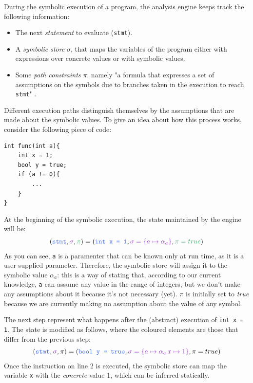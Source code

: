 \documentclass[12pt,a4paper]{book}
\theoremstyle{definition}
\begin{document}
	During the symbolic execution of a program, the analysis engine keeps track the following information:
	\begin{itemize}
		\item The next \textit{statement} to evaluate (\texttt{stmt}).
		\item A \textit{symbolic store} $\sigma$, that maps the variables of the program either with expressions over concrete values or with symbolic values.
		\item Some \textit{path constraints} $\pi$, namely "a formula that expresses a set of assumptions on the symbols due to branches taken in the execution to reach \texttt{stmt}" \cite{Baldoni2018}.
	\end{itemize}
	Different execution paths distinguish themselves by the assumptions that are made about the symbolic values. To give an idea about how this process works, consider the following piece of code:
	\begin{lstlisting}
int func(int a){
	int x = 1;
	bool y = true;
	if (a != 0){
		...
	}
}
	\end{lstlisting} 
	At the beginning of the symbolic execution, the state maintained by the engine will be:
	\[
	(\textcolor{blue}{\texttt{stmt}}, \textcolor{violet}{\sigma}, \textcolor{green}{\pi}) = (\textcolor{blue}{\texttt{int x = 1}}, \textcolor{violet}{\sigma = \{a \mapsto \alpha_a\}}, \textcolor{green}{\pi = true})
	\]
	As you can see, \texttt{a} is a paramenter that can be known only at run time, as it is a user-supplied parameter. Therefore, the symbolic store will assign it to the symbolic value $\alpha_a$: this is a way of stating that, according to our current knowledge, \texttt{a} can assume any value in the range of integers, but we don't make any assumptions about it because it's not necessary (yet). $\pi$ is initially set to \textit{true} because we are currently making no assumption about the value of any symbol.
	
	The next step represent what happens after the (abstract) execution of \texttt{int x = 1}. The state is modified as follows, where the coloured elements are those that differ from the previous step:
	\[
	(\textcolor{blue}{\texttt{stmt}}, \textcolor{violet}{\sigma}, \pi) = (\textcolor{blue}{\texttt{bool y = true}}, \textcolor{violet}{\sigma = \{a \mapsto \alpha_a\, x \mapsto 1\}}, \pi = true)
	\] 
	Once the instruction on line 2 is executed, the symbolic store can map the variable \texttt{x} with the \textit{concrete} value 1, which can be inferred statically.
	
\end{document}
